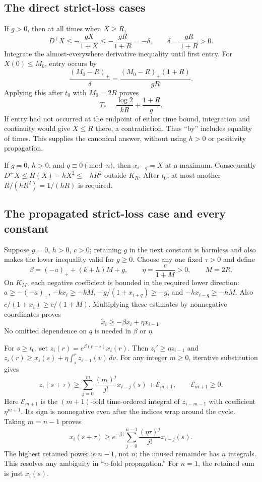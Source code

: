 \documentclass[11pt]{article}
\newcommand{\pos}[1]{(#1)_+}
\begin{document}
\subsection{The direct strict-loss cases}
If $g>0$, then at all times when $X\geq R$,
\[
 D^+X\leq-\frac{gX}{1+X}
          \leq-\frac{gR}{1+R}=-\delta,
 \qquad\delta=\frac{gR}{1+R}>0.
\]
Integrate the almost-everywhere derivative inequality until first entry.
For $X(0)\leq M_0$, entry occurs by
\[
 \frac{\pos{M_0-R}}{\delta}
   =\frac{\pos{M_0-R}(1+R)}{gR}.
\]
Applying this after $t_0$ with $M_0=2R$ proves
\begin{equation}\label{A01:Tstar}
 T_*=\frac{\log2}{kR}+\frac{1+R}{g}.
\end{equation}
If entry had not occurred at the endpoint of either time bound,
integration and continuity would give $X\leq R$ there, a contradiction.
Thus ``by'' includes equality of times. This supplies the canonical
answer, without using $h>0$ or positivity propagation.

If $g=0$, $h>0$, and $q\equiv0\pmod n$, then $x_{i-q}=X$ at a maximum.
Consequently $D^+X\leq H(X)-hX^2\leq-hR^2$ outside $K_R$.
After $t_0$, at most another $R/(hR^2)=1/(hR)$ is required.

\subsection{The propagated strict-loss case and every constant}
Suppose $g=0$, $h>0$, $c>0$; retaining $g$ in the next constant is
harmless and also makes the lower inequality valid for $g\geq0$.
Choose any one fixed $\tau>0$ and define
\begin{equation}\label{A01:constants}
 \beta=(-a)_++(k+h)M+g,\qquad
 \eta=\frac{c}{1+M}>0,\qquad M=2R.
\end{equation}
On $K_M$, each negative coefficient is bounded in the required lower
direction: $a\geq-(-a)_+$, $-kx_i\geq-kM$,
$-g/(1+x_{i+q})\geq-g$, and $-hx_{i-q}\geq-hM$. Also
$c/(1+x_i)\geq c/(1+M)$. Multiplying these estimates by nonnegative
coordinates proves
\begin{equation}\label{A01:lower}
 \dot x_i\geq-\beta x_i+\eta x_{i-1}.
\end{equation}
No omitted dependence on $q$ is needed in $\beta$ or $\eta$.

For $s\geq t_0$, set $z_i(r)=e^{\beta(r-s)}x_i(r)$. Then
$z_i'\geq\eta z_{i-1}$ and
$z_i(r)\geq x_i(s)+\eta\int_s^r z_{i-1}(v)\,dv$.
For any integer $m\geq0$, iterative substitution gives
\[
 z_i(s+\tau)\geq
 \sum_{j=0}^{m}\frac{(\eta\tau)^j}{j!}x_{i-j}(s)
       +\mathcal E_{m+1},\qquad \mathcal E_{m+1}\geq0.
\]
Here $\mathcal E_{m+1}$ is the $(m+1)$-fold time-ordered integral of
$z_{i-m-1}$ with coefficient $\eta^{m+1}$. Its sign is nonnegative
even after the indices wrap around the cycle. Taking $m=n-1$ proves
\begin{equation}\label{A01:series}
 x_i(s+\tau)\geq e^{-\beta\tau}
    \sum_{j=0}^{n-1}\frac{(\eta\tau)^j}{j!}x_{i-j}(s).
\end{equation}
The highest retained power is $n-1$, not $n$; the unused remainder
has $n$ integrals. This resolves any ambiguity in ``$n$-fold
propagation.'' For $n=1$, the retained sum is just $x_i(s)$.
\end{document}
